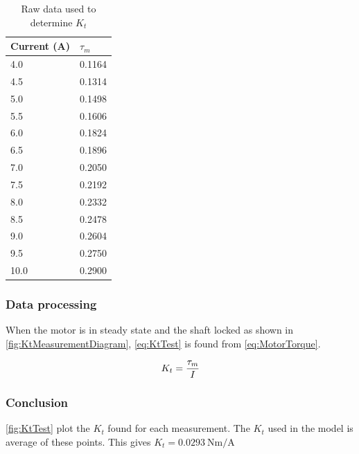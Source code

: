 \begin{table}[htbp]
	\centering
	\caption{Raw data used to determine $K_t$}\label{tab_appendix:KtData}
	\begin{tabularx}{0.35\textwidth}{XX}
		Current (A) & $\tau_m$\\ \toprule \rowcolor{lightGrey}
	4.0 & 0.1164 \\
	4.5 & 0.1314 \\ \rowcolor{lightGrey}
	5.0 & 0.1498 \\
	5.5 & 0.1606 \\ \rowcolor{lightGrey}
	6.0 & 0.1824 \\
	6.5 & 0.1896 \\ \rowcolor{lightGrey}
	7.0 & 0.2050 \\
	7.5 & 0.2192 \\ \rowcolor{lightGrey}
	8.0 & 0.2332 \\
	8.5 & 0.2478 \\ \rowcolor{lightGrey}
	9.0 & 0.2604 \\
	9.5 & 0.2750 \\ \rowcolor{lightGrey}
	10.0 & 0.2900
	\end{tabularx}
\end{table}

\subsubsection*{Data processing}

When the motor is in steady state and the shaft locked as shown in \autoref{fig:KtMeasurementDiagram}, \autoref{eq:KtTest} is found from \autoref{eq:MotorTorque}.

\begin{equation}\label{eq:KtTest}
	K_t=\frac{\tau_m}{I} \addunit{\newton\meter\per\ampere}
\end{equation}

\startexplain
{}
\stopexplain

\subsubsection*{Conclusion}

\autoref{fig:KtTest} plot the $K_t$ found for each measurement. The $K_t$ used in the model is average of these points. This gives $K_t=\SI{0.0293}{\newton\meter\per\ampere}$

